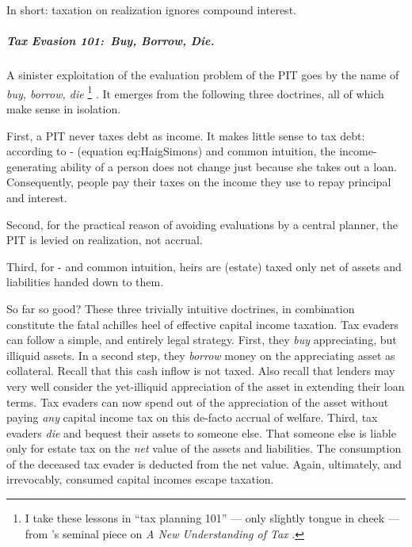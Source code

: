 In short:
taxation on realization ignores compound interest.

\subparagraph{Tax Evasion 101:~Buy, Borrow, Die.}  \label{sec:TaxEvasion101} A sinister exploitation of the evaluation problem of the PIT goes by the name of \emph{buy, borrow, die}
\footnote{
	I take these lessons in ``tax planning 101'' --- only slightly tongue in cheek --- from \citeauthor{McCaffery2005}'s seminal piece on \emph{A New Understanding of Tax} \citeyearpar[888ff]{McCaffery2005}.
}
.
It emerges from the following three doctrines, all of which make sense in isolation.


First, a PIT never taxes debt as income.
It makes little sense to tax debt:
according to \citeauthor{Haig1921}-\citeauthor{Simons1938} (equation {eq:HaigSimons}) and common intuition, the income-generating ability of a person does not change just because she takes out a loan.
Consequently, people pay their taxes on the income they use to repay principal and interest.

Second, for the practical reason of avoiding evaluations by a central planner, the PIT is levied on realization, not accrual.

Third, for \citeauthor{Haig1921}-\citeauthor{Simons1938} and common intuition, heirs are (estate) taxed only net of assets and liabilities handed down to them.

So far so good?
These three trivially intuitive doctrines, in combination constitute the fatal achilles heel of effective capital income taxation.
Tax evaders can follow a simple, and entirely legal strategy.
First, they \emph{buy} appreciating, but illiquid assets.
In a second step, they \emph{borrow} money on the appreciating asset as collateral.
Recall that this cash inflow is not taxed.
Also recall that lenders may very well consider the yet-illiquid appreciation of the asset in extending their loan terms.
Tax evaders can now spend out of the appreciation of the asset without paying \emph{any} capital income tax on this de-facto accrual of welfare.
Third, tax evaders \emph{die} and bequest their assets to someone else.
That someone else is liable only for estate tax on the \emph{net} value of the assets and liabilities.
The consumption of the deceased tax evader is deducted from the net value.
Again, ultimately, and irrevocably, consumed capital incomes escape taxation.

